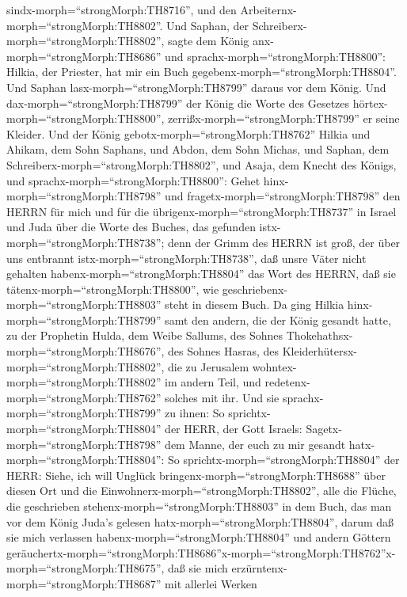 sindx-morph=``strongMorph:TH8716'', und den
Arbeiternx-morph=``strongMorph:TH8802''.  Und Saphan, der
Schreiberx-morph=``strongMorph:TH8802'', sagte dem König
anx-morph=``strongMorph:TH8686'' und
sprachx-morph=``strongMorph:TH8800'': Hilkia, der Priester, hat mir ein
Buch gegebenx-morph=``strongMorph:TH8804''. Und Saphan
lasx-morph=``strongMorph:TH8799'' daraus vor dem König. 
Und dax-morph=``strongMorph:TH8799'' der König die Worte des Gesetzes
hörtex-morph=``strongMorph:TH8800'',
zerrißx-morph=``strongMorph:TH8799'' er seine Kleider.  Und
der König gebotx-morph=``strongMorph:TH8762'' Hilkia und Ahikam, dem
Sohn Saphans, und Abdon, dem Sohn Michas, und Saphan, dem
Schreiberx-morph=``strongMorph:TH8802'', und Asaja, dem Knecht des
Königs, und sprachx-morph=``strongMorph:TH8800'':  Gehet
hinx-morph=``strongMorph:TH8798'' und
fragetx-morph=``strongMorph:TH8798'' den HERRN für mich und für die
übrigenx-morph=``strongMorph:TH8737'' in Israel und Juda über die Worte
des Buches, das gefunden istx-morph=``strongMorph:TH8738''; denn der
Grimm des HERRN ist groß, der über uns entbrannt
istx-morph=``strongMorph:TH8738'', daß unsre Väter nicht gehalten
habenx-morph=``strongMorph:TH8804'' das Wort des HERRN, daß sie
tätenx-morph=``strongMorph:TH8800'', wie
geschriebenx-morph=``strongMorph:TH8803'' steht in diesem Buch.
 Da ging Hilkia hinx-morph=``strongMorph:TH8799'' samt den
andern, die der König gesandt hatte, zu der Prophetin Hulda, dem Weibe
Sallums, des Sohnes Thokehathsx-morph=``strongMorph:TH8676'', des Sohnes
Hasras, des Kleiderhütersx-morph=``strongMorph:TH8802'', die zu
Jerusalem wohntex-morph=``strongMorph:TH8802'' im andern Teil, und
redetenx-morph=``strongMorph:TH8762'' solches mit ihr.  Und
sie sprachx-morph=``strongMorph:TH8799'' zu ihnen: So
sprichtx-morph=``strongMorph:TH8804'' der HERR, der Gott Israels:
Sagetx-morph=``strongMorph:TH8798'' dem Manne, der euch zu mir gesandt
hatx-morph=``strongMorph:TH8804'':  So
sprichtx-morph=``strongMorph:TH8804'' der HERR: Siehe, ich will Unglück
bringenx-morph=``strongMorph:TH8688'' über diesen Ort und die
Einwohnerx-morph=``strongMorph:TH8802'', alle die Flüche, die
geschrieben stehenx-morph=``strongMorph:TH8803'' in dem Buch, das man
vor dem König Juda's gelesen hatx-morph=``strongMorph:TH8804'',
 darum daß sie mich verlassen
habenx-morph=``strongMorph:TH8804'' und andern Göttern
geräuchertx-morph=``strongMorph:TH8686''x-morph=``strongMorph:TH8762''\textbar x-morph=``strongMorph:TH8675'',
daß sie mich erzürntenx-morph=``strongMorph:TH8687'' mit allerlei Werken
